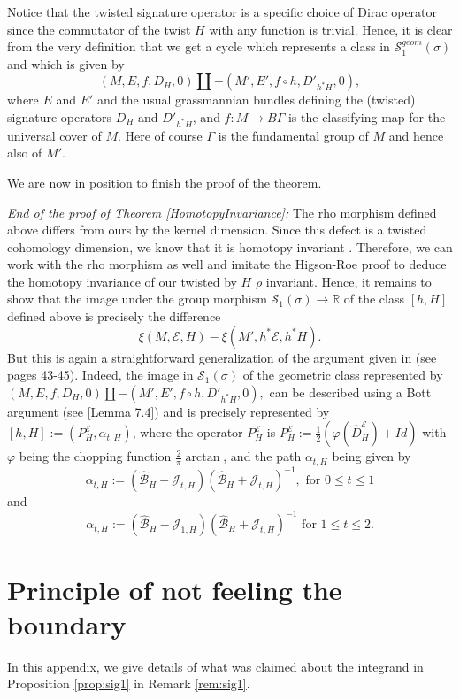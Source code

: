 \documentclass[12pt]{amsart}
\theoremstyle{plain}
\theoremstyle{definition}
\theoremstyle{remark}
\begin{document}
{Notice that the twisted signature operator is a specific choice of Dirac operator  since the commutator of the twist $H$ with any function is trivial. Hence, it is clear from the very definition  that we get a cycle which represents a class in ${\mathcal S}_1^{geom}(\sigma)$ and which is given by 
$$
(M, E, f, D_H, 0) \amalg -(M', E', f\circ h, D'_{h^*H}, 0),
$$
where $E$ and $E'$ and the usual grassmannian bundles defining the (twisted) signature operators $D_H$ and $D'_{h^*H}$,  and $f:M\to B\Gamma$ is the classifying map for the universal cover of $M$. Here of course $\Gamma$ is the fundamental group of $M$ and hence also of $M'$. 

We are now in position to finish the proof of the theorem.

{\em{End of the proof of Theorem \ref{HomotopyInvariance}:}} The rho morphism defined above differs from ours by the kernel dimension. Since this defect is a twisted cohomology dimension, we know that it is homotopy invariant \cite{MW}. Therefore, we can work with the rho morphism as well and imitate the Higson-Roe proof to deduce the homotopy invariance of our twisted by $H$ $\rho$ invariant.  
Hence,  it  remains to show that the image under the group morphism ${\mathcal S}_1(\sigma) \longrightarrow {\mathbb{R}}$ of the class  $[h, H]$ defined above is precisely the difference
$$
\xi (M, {\mathcal E}, H) - \xi (M', h^*{\mathcal E}, h^*H).
$$
But this is again a  straightforward generalization of the argument given in \cite{HigsonRoeRho} (see pages 43-45).  Indeed, the image in  ${\mathcal S}_1(\sigma)$ of the geometric class represented by  $
(M, E, f, D_H, 0) \amalg -(M', E', f\circ h, D'_{h^*H}, 0),
$ can be described using a Bott argument (see \cite{HigsonRoeRho}[Lemma 7.4]) and is precisely represented by   $[h, H]:= (P_H^{\mathcal E}, \alpha_{t,H})$, where  the operator $P_H^{\mathcal E}$ is $P_H^{\mathcal E} := \frac{1}{2} (\varphi ({\hat D}_H^{\mathcal E}) + Id)$ with $\varphi $ being the chopping function $\frac{2}{\pi} \arctan$, and the path $\alpha_{t, H}$ being given by
$$
\alpha_{t,H} := ({\hat {\mathcal B}}_H - {\mathcal J}_{t, H})({\hat {\mathcal B}}_H + {\mathcal J}_{t, H})^{-1}, \text{ for }0\leq t \leq 1
$$
  and 
  $$
    \alpha_{t,H} := ({\hat {\mathcal B}}_H - {\mathcal J}_{1, H})({\hat {\mathcal B}}_H + {\mathcal J}_{t, H})^{-1} \text{ for } 1\leq t\leq 2.
$$

\bigskip

\appendix
\section{Principle of not feeling the boundary}
In this appendix, we give details of what was claimed about the integrand in Proposition \ref{prop:sig1}
in Remark \ref{rem:sig1}.

}
\end{document}
